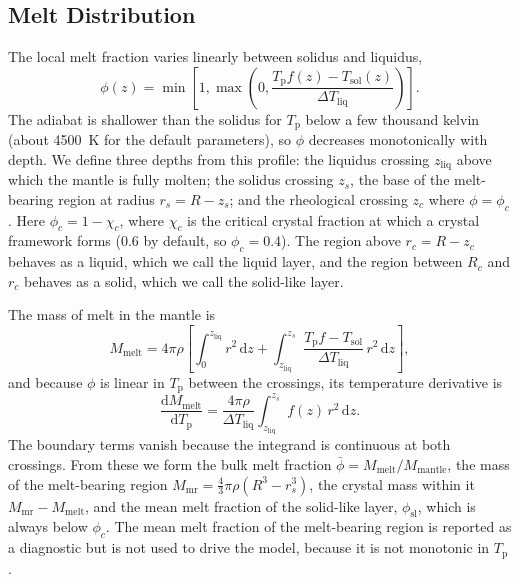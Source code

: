 \documentclass[11pt]{article}
\newcommand{\Tp}{T_\mathrm{p}}
\newcommand{\dd}{\mathrm{d}}
\begin{document}
\subsection{Melt Distribution}

The local melt fraction varies linearly between solidus and liquidus,
\begin{equation}
\phi(z) = \min\left[1, \max\left(0, \frac{\Tp f(z) - T_\mathrm{sol}(z)}{\Delta T_\mathrm{liq}}\right)\right].
\end{equation}
The adiabat is shallower than the solidus for $\Tp$ below a few thousand kelvin (about 4500~K for the default parameters), so $\phi$ decreases monotonically with depth. We define three depths from this profile: the liquidus crossing $z_\mathrm{liq}$ above which the mantle is fully molten; the solidus crossing $z_s$, the base of the melt-bearing region at radius $r_s = R - z_s$; and the rheological crossing $z_c$ where $\phi = \phi_c$. Here $\phi_c = 1 - \chi_c$, where $\chi_c$ is the critical crystal fraction at which a crystal framework forms (0.6 by default, so $\phi_c = 0.4$). The region above $r_c = R - z_c$ behaves as a liquid, which we call the liquid layer, and the region between $R_c$ and $r_c$ behaves as a solid, which we call the solid-like layer.

The mass of melt in the mantle is
\begin{equation}
M_\mathrm{melt} = 4 \pi \rho \left[ \int_0^{z_\mathrm{liq}} r^2 \, \dd z
+ \int_{z_\mathrm{liq}}^{z_s} \frac{\Tp f - T_\mathrm{sol}}{\Delta T_\mathrm{liq}} \, r^2 \, \dd z \right],
\end{equation}
and because $\phi$ is linear in $\Tp$ between the crossings, its temperature derivative is
\begin{equation}
\frac{\dd M_\mathrm{melt}}{\dd \Tp} = \frac{4 \pi \rho}{\Delta T_\mathrm{liq}} \int_{z_\mathrm{liq}}^{z_s} f(z) \, r^2
\, \dd z.
\label{eq:dmelt}
\end{equation}
The boundary terms vanish because the integrand is continuous at both crossings. From these we form the bulk melt fraction $\bar{\phi} = M_\mathrm{melt} / M_\mathrm{mantle}$, the mass of the melt-bearing region $M_\mathrm{mr} = \frac{4}{3}\pi \rho (R^3 - r_s^3)$, the crystal mass within it $M_\mathrm{mr} - M_\mathrm{melt}$, and the mean melt fraction of the solid-like layer, $\phi_\mathrm{sl}$, which is always below $\phi_c$. The mean melt fraction of the melt-bearing region is reported as a diagnostic but is not used to drive the model, because it is not monotonic in $\Tp$.
\end{document}
